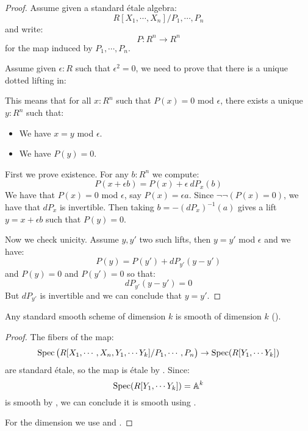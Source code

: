 \begin{proof}
Assume given a standard étale algebra:
\[R[X_1,\cdots,X_n]/P_1,\cdots,P_n\]
and write:
\[P:R^n\to R^n\]
for the map induced by $P_1,\cdots,P_n$.

Assume given $\epsilon:R$ such that $\epsilon^2=0$, we need to prove that there is a unique dotted lifting in:
  \begin{center}
    \end{center}
This means that for all $x:R^n$ such that $P(x)=0$ mod $\epsilon$, there exists a unique $y:R^n$ such that:
\begin{itemize} 
\item We have $x=y$ mod $\epsilon$.
\item We have $P(y)=0$.
\end{itemize}

First we prove existence. For any $b:R^n$ we compute:
\[P(x+\epsilon b) = P(x) + \epsilon\ dP_x(b)\]
We have that $P(x)=0$ mod $\epsilon$, say $P(x) = \epsilon a$. Since $\neg\neg(P(x) = 0)$, we have that $dP_x$ is invertible. Then taking $b = -(dP_x)^{-1}(a)$ gives a lift $y=x+\epsilon b$ such that $P(y) = 0$.

Now we check unicity. Assume $y,y'$ two such lifts, then $y=y'$ mod $\epsilon$ and we have:
\[P(y) = P(y') + dP_{y'}(y-y')\]
and $P(y)=0$ and $P(y')=0$ so that:
\[dP_{y'}(y-y') = 0\]
But $dP_{y'}$ is invertible and we can conclude that $y=y'$.
\end{proof}

\begin{lemma}\label{standard-smooth-is-smooth}
Any standard smooth scheme of dimension $k$ is smooth of dimension $k$ ().
\end{lemma}

\begin{proof}
The fibers of the map:
\[\operatorname{Spec}\big(R[X_1,\cdots,X_n,Y_1,\cdots Y_{k}] / P_1,\cdots,P_n\big) \to \operatorname{Spec}(R[Y_1,\cdots Y_{k}])\]
are standard étale, so the map is étale by . Since:
\[\operatorname{Spec}(R[Y_1,\cdots Y_{k}]) = \mathbb{A}^k\]
is smooth by , we can conclude it is smooth using . 

For the dimension we use  and .
\end{proof}



